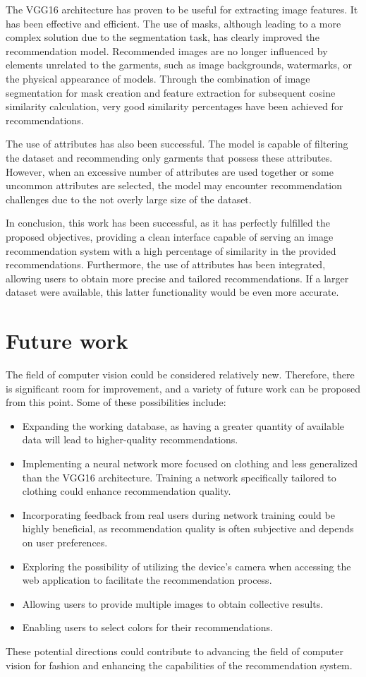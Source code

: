 \documentclass[12pt]{report} %
\begin{document}
The VGG16 architecture has proven to be useful for extracting image features. It has been effective and efficient. The use of masks, although leading to a more complex solution due to the segmentation task, has clearly improved the recommendation model. Recommended images are no longer influenced by elements unrelated to the garments, such as image backgrounds, watermarks, or the physical appearance of models. Through the combination of image segmentation for mask creation and feature extraction for subsequent cosine similarity calculation, very good similarity percentages have been achieved for recommendations.

The use of attributes has also been successful. The model is capable of filtering the dataset and recommending only garments that possess these attributes. However, when an excessive number of attributes are used together or some uncommon attributes are selected, the model may encounter recommendation challenges due to the not overly large size of the dataset.

In conclusion, this work has been successful, as it has perfectly fulfilled the proposed objectives, providing a clean interface capable of serving an image recommendation system with a high percentage of similarity in the provided recommendations. Furthermore, the use of attributes has been integrated, allowing users to obtain more precise and tailored recommendations. If a larger dataset were available, this latter functionality would be even more accurate.

\section*{Future work}
The field of computer vision could be considered relatively new. Therefore, there is significant room for improvement, and a variety of future work can be proposed from this point. Some of these possibilities include:
\begin{itemize}
	\item Expanding the working database, as having a greater quantity of available data will lead to higher-quality recommendations.
	\item Implementing a neural network more focused on clothing and less generalized than the VGG16 architecture. Training a network specifically tailored to clothing could enhance recommendation quality.
	\item Incorporating feedback from real users during network training could be highly beneficial, as recommendation quality is often subjective and depends on user preferences.
	\item Exploring the possibility of utilizing the device's camera when accessing the web application to facilitate the recommendation process.
	\item Allowing users to provide multiple images to obtain collective results.
	\item Enabling users to select colors for their recommendations.
\end{itemize}

These potential directions could contribute to advancing the field of computer vision for fashion and enhancing the capabilities of the recommendation system.
\end{document}

